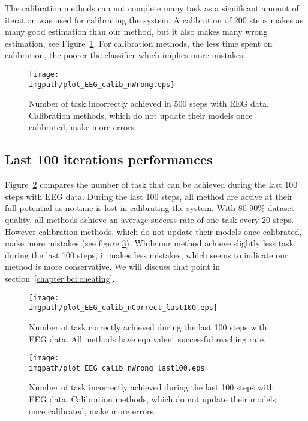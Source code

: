 The calibration methods can not complete many task as a significant amount of iteration was used for calibrating the system. A calibration of 200 steps makes as many good estimation than our method, but it also makes many wrong estimation, see Figure~\ref{fig:nWrongEEG}. For calibration methods, the less time spent on calibration, the poorer the classifier which implies more mistakes.

\begin{figure}[!htbp]
\centering
\texttt{[image: \\imgpath/plot\_EEG\_calib\_nWrong.eps]}
\caption{Number of task incorrectly achieved in 500 steps with EEG data. Calibration methods, which do not update their models once calibrated, make more errors.}
\label{fig:nWrongEEG}
\end{figure}

\subsection{Last 100 iterations performances}

Figure~\ref{fig:nCorrectEEG_last100} compares the number of task that can be achieved during the last 100 steps with EEG data. During the last 100 steps, all method are active at their full potential as no time is lost in calibrating the system. With 80-90\% dataset quality, all methods achieve an average success rate of one task every 20 steps. However calibration methods, which do not update their models once calibrated, make more mistakes (see figure \ref{fig:nWrongEEG_last100}). While our method achieve slightly less task during the last 100 steps, it makes less mistakes, which seems to indicate our method is more conservative. We will discuss that point in section~\ref{chapter:bci:cheating}.

\begin{figure}[!htbp]
\centering
\texttt{[image: \\imgpath/plot\_EEG\_calib\_nCorrect\_last100.eps]}
\caption{Number of task correctly achieved during the last 100 steps with EEG data. All methods have equivalent successful reaching rate.}
\label{fig:nCorrectEEG_last100}
\end{figure} 

\begin{figure}[!htbp]
\centering
\texttt{[image: \\imgpath/plot\_EEG\_calib\_nWrong\_last100.eps]}
\caption{Number of task incorrectly achieved during the last 100 steps with EEG data. Calibration methods, which do not update their models once calibrated, make more errors.}
\label{fig:nWrongEEG_last100}
\end{figure} 

